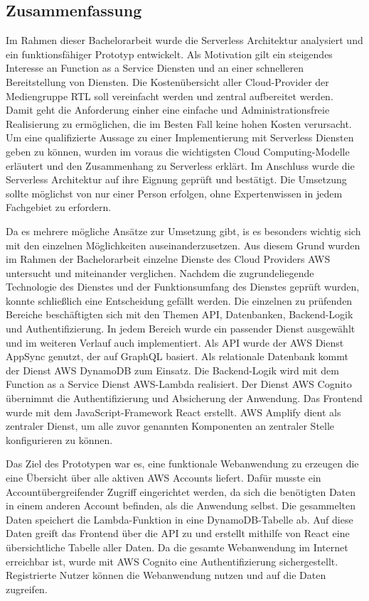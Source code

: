 \clearpage
\subsection{Zusammenfassung}
Im Rahmen dieser Bachelorarbeit wurde die Serverless Architektur analysiert und ein funktionsfähiger Prototyp entwickelt.
Als Motivation gilt ein steigendes Interesse an Function as a Service Diensten und an einer schnelleren Bereitstellung von Diensten.
Die Kostenübersicht aller Cloud-Provider der Mediengruppe RTL soll vereinfacht werden und zentral aufbereitet werden.
Damit geht die Anforderung einher eine einfache und Administrationsfreie Realisierung zu ermöglichen, die im Besten Fall keine hohen Kosten verursacht.
Um eine qualifizierte Aussage zu einer Implementierung mit Serverless Diensten geben zu können, wurden im voraus die wichtigsten Cloud Computing-Modelle erläutert und den Zusammenhang zu Serverless erklärt.
Im Anschluss wurde die Serverless Architektur auf ihre Eignung geprüft und bestätigt.
Die Umsetzung sollte möglichst von nur einer Person erfolgen, ohne Expertenwissen in jedem Fachgebiet zu erfordern.

Da es mehrere mögliche Ansätze zur Umsetzung gibt, is es besonders wichtig sich mit den einzelnen Möglichkeiten auseinanderzusetzen.
Aus diesem Grund wurden im Rahmen der Bachelorarbeit einzelne Dienste des Cloud Providers AWS untersucht und miteinander verglichen.
Nachdem die zugrundeliegende Technologie des Dienstes und der Funktionsumfang des Dienstes geprüft wurden, konnte schließlich eine Entscheidung gefällt werden.
Die einzelnen zu prüfenden Bereiche beschäftigten sich mit den Themen API, Datenbanken, Backend-Logik und Authentifizierung.
In jedem Bereich wurde ein passender Dienst ausgewählt und im weiteren Verlauf auch implementiert.
Als API wurde der AWS Dienst AppSync genutzt, der auf GraphQL basiert.
Als relationale Datenbank kommt der Dienst AWS DynamoDB zum Einsatz.
Die Backend-Logik wird mit dem Function as a Service Dienst AWS-Lambda realisiert.
Der Dienst AWS Cognito übernimmt die Authentifizierung und Absicherung der Anwendung.
Das Frontend wurde mit dem JavaScript-Framework React erstellt.
AWS Amplify dient als zentraler Dienst, um alle zuvor genannten Komponenten an zentraler Stelle konfigurieren zu können.

Das Ziel des Prototypen war es, eine funktionale Webanwendung zu erzeugen die eine Übersicht über alle aktiven AWS Accounts liefert.
Dafür musste ein Accountübergreifender Zugriff eingerichtet werden, da sich die benötigten Daten in einem anderen Account befinden, als die Anwendung selbst.
Die gesammelten Daten speichert die Lambda-Funktion in eine DynamoDB-Tabelle ab.
Auf diese Daten greift das Frontend über die API zu und erstellt mithilfe von React eine übersichtliche Tabelle aller Daten.
Da die gesamte Webanwendung im Internet erreichbar ist, wurde mit AWS Cognito eine Authentifizierung sichergestellt.
Registrierte Nutzer können die Webanwendung nutzen und auf die Daten zugreifen.

